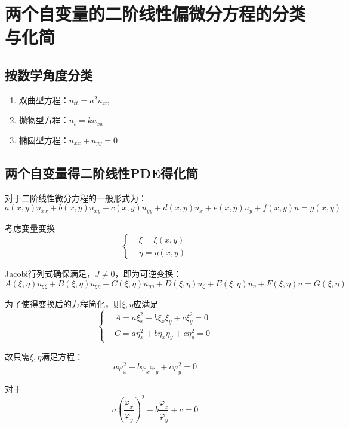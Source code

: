 \documentclass{article}
\begin{document}
\section{两个自变量的二阶线性偏微分方程的分类与化简}
\subsection{按数学角度分类}

\begin{enumerate}
    \item 双曲型方程：$u_{tt}=a^2 u_{xx}$
    \item 抛物型方程：$u_t=ku_{xx}$
    \item 椭圆型方程：$u_{xx}+u_{yy}=0$
\end{enumerate}
\subsection{两个自变量得二阶线性PDE得化简}
对于二阶线性微分方程的一般形式为：
$$
    a(x,y)u_{xx}+b(x,y)u_{xy}+c(x,y)u_{yy}+d(x,y)u_x+e(x,y)u_y+f(x,y)u=g(x,y)
$$

考虑变量变换
$$
    \left\{
    \begin{aligned}
         & \xi = \xi(x,y)   \\
         & \eta = \eta(x,y)
    \end{aligned}
    \right.
$$

Jacobi行列式确保满足，$J \ne 0$，即为可逆变换：
$$
    A(\xi,\eta)u_{\xi\xi}+B(\xi,\eta)u_{\xi\eta}+C(\xi,\eta)u_{\eta\eta}+D(\xi,\eta)u_\xi+E(\xi,\eta)u_\eta+F(\xi,\eta)u=G(\xi,\eta)
$$

为了使得变换后的方程简化，则$\xi,\eta$应满足
$$
    \left\{
    \begin{aligned}
         & A = a\xi_x^2+b\xi_x\xi_y+c\xi_y^2=0     \\
         & C = a\eta_x^2+b\eta_x\eta_y+c\eta_y^2=0
    \end{aligned}
    \right.
$$

故只需$\xi,\eta$满足方程：
$$
    a\varphi_x^2+b\varphi_x\varphi_y+c\varphi_y^2=0
$$

对于
$$
    a\left(\frac{\varphi_x}{\varphi_y}\right)^2+b\frac{\varphi_x}{\varphi_y}+c =0
$$
\end{document}
